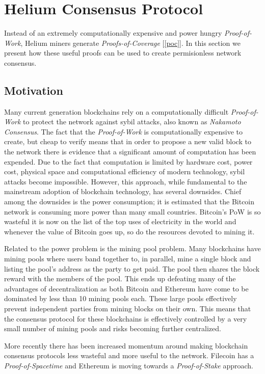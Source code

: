 \documentclass[10pt, nonatbib, nocopyrightspace, reprint]{sigplanconf}
\newcommand{\secref}[1]{[\autoref{#1}]}
\begin{document}
\section{Helium Consensus Protocol}\label{consensus}

Instead of an extremely computationally expensive and power hungry \emph{Proof-of-Work}, Helium miners generate \emph{Proofs-of-Coverage} \secref{poc}. In this section we present how these useful proofs can be used to create permisionless network consensus.

\subsection{Motivation}

Many current generation blockchains rely on a computationally difficult \emph{Proof-of-Work} to protect the network against sybil attacks, also known as \emph{Nakamoto Consensus}. The fact that the \emph{Proof-of-Work} is computationally expensive to create, but cheap to verify means that in order to propose a new valid block to the network there is evidence that a significant amount of computation has been expended. Due to the fact that computation is limited by hardware cost, power cost, physical space and computational efficiency of modern technology, sybil attacks become impossible. However, this approach, while fundamental to the mainstream adoption of blockchain technology, has several downsides. Chief among the downsides is the power consumption; it is estimated that the Bitcoin network is consuming more power than many small countries. Bitcoin's PoW is so wasteful it is now on the list of the top uses of electricity in the world and whenever the value of Bitcoin goes up, so do the resources devoted to mining it.

Related to the power problem is the mining pool problem. Many blockchains have mining pools where users band together to, in parallel, mine a single block and listing the pool's address as the party to get paid. The pool then shares the block reward with the members of the pool. This ends up defeating many of the advantages of decentralization as both Bitcoin and Ethereum have come to be dominated by less than 10 mining pools each. These large pools effectively prevent independent parties from mining blocks on their own. This means that the consensus protocol for these blockchains is effectively controlled by a very small number of mining pools and risks becoming further centralized.

More recently there has been increased momentum around making blockchain consensus protocols less wasteful and more useful to the network. Filecoin \cite{filecoin} has a \emph{Proof-of-Spacetime} and Ethereum \cite{ethereum} is moving towards a \emph{Proof-of-Stake} \cite{pos} approach.
\end{document}

